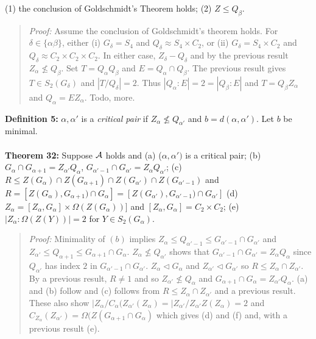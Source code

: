 (1) the conclusion of Goldschmidt's Theorem holds; (2) $Z \leq Q_{\beta}$.
\begin{quote}
\emph{Proof:}  
Assume the conclusion of Goldschmidt's theorem holds.  For $\delta \in \{ \alpha \beta \}$,
either 
(i) $G_{\delta} = S_4$ and $Q_{\delta} \approx S_4 \times C_2$, or 
(ii) $G_{\delta} = S_4 \times C_2$ and $Q_{\delta} \approx C_2 \times C_2 \times C_2$.  In either
case, $Z_{\delta} - Q_{\delta}$ and by the previous result $Z_{\alpha} \nleq Q_{\beta}$.
Set $T= Q_{\alpha} Q_{\beta}$ and $E= Q_{\alpha} \cap Q_{\beta}$.  The previous result gives
$T \in S_2(G_{\delta})$ and $|T/Q_{\delta}|=2$.  Thus 
$ |Q_{\alpha}:E|=2= |Q_{\beta}:E| $ and
$T= Q_{\beta}Z_{\alpha}$ and
$Q_{\alpha}= E Z_{\alpha}$.
Todo, more.
\end{quote}
{\bf Definition 5:} 
$\alpha, \alpha'$ is a \emph{critical pair} if $Z_{\alpha} \nleq Q_{\alpha'}$ and
$b=d(\alpha, \alpha')$.  Let $b$ be minimal.
\\
\\
{\bf Theorem 32:}
Suppose ${\cal A}$ holds and (a) ($\alpha, \alpha')$ is a critical pair;
(b) $G_{\alpha} \cap G_{\alpha+1} = Z_{\alpha'}Q_{\alpha}$, $G_{\alpha'-1} \cap G_{\alpha'} = Z_{\alpha}Q_{\alpha'}$;
(c) $R \leq Z(G_{\alpha}) \cap Z(G_{\alpha+1}) \cap Z(G_{\alpha'}) \cap Z(G_{\alpha'-1})$ and
$R = [Z(G_{\alpha}), G_{\alpha+1}) \cap G_{\alpha}]= [Z(G_{\alpha'}), G_{\alpha'-1}) \cap G_{\alpha'}] $
(d) $ Z_{\alpha} = [ Z_{\alpha} , G_{\alpha} ] \times \Omega( Z(G_{\alpha} ))] $ and
$[ Z_{\alpha} , G_{\alpha} ] = C_2 \times C_2$;
(e) $|Z_{\alpha}:\Omega(Z(Y))|=2$ for $Y \in S_2(G_{\alpha})$.
\begin{quote}
\emph{Proof:}  
Minimality of $(b)$ implies 
$Z_{\alpha} \leq Q_{\alpha'-1} \leq G_{\alpha'-1} \cap G_{\alpha'} $ and
$Z_{\alpha'} \leq Q_{\alpha+1} \leq G_{\alpha+1} \cap G_{\alpha} $.
$Z_{\alpha} \nleq Q_{\alpha'}$ shows that
$G_{\alpha'-1} \cap G_{\alpha'} = Z_{\alpha} Q_{\alpha} $ since $Q_{\alpha'}$ has index $2$ in
$G_{\alpha'-1} \cap G_{\alpha'}$.
$Z_{\alpha} \lhd G_{\alpha}$ and
$Z_{\alpha'} \lhd G_{\alpha'}$  so
$R \leq Z_{\alpha} \cap Z_{\alpha'} $.  By a previous result, $R \neq 1$ and so $Z_{\alpha'} \nleq Q_{\alpha}$
and $G_{\alpha+1} \cap G_{\alpha}= Z_{\alpha'} Q_{\alpha}$.  (a) and (b) follow and (c) follows from
$R \leq Z_{\alpha} \cap Z_{\alpha'} $ and a previous result.   These also show
$ |Z_{\alpha} / C_{\alpha}(Z_{\alpha'}(Z_{\alpha})= |Z_{\alpha'} / Z_{\alpha'}Z(Z_{\alpha}) =2 $
and
$C_{Z_{\alpha}}(Z_{\alpha'})= \Omega( Z(
G_{\alpha+1} \cap G_{\alpha}
)$ which gives (d) and (f) and, with a previous result (e).
\end{quote}
